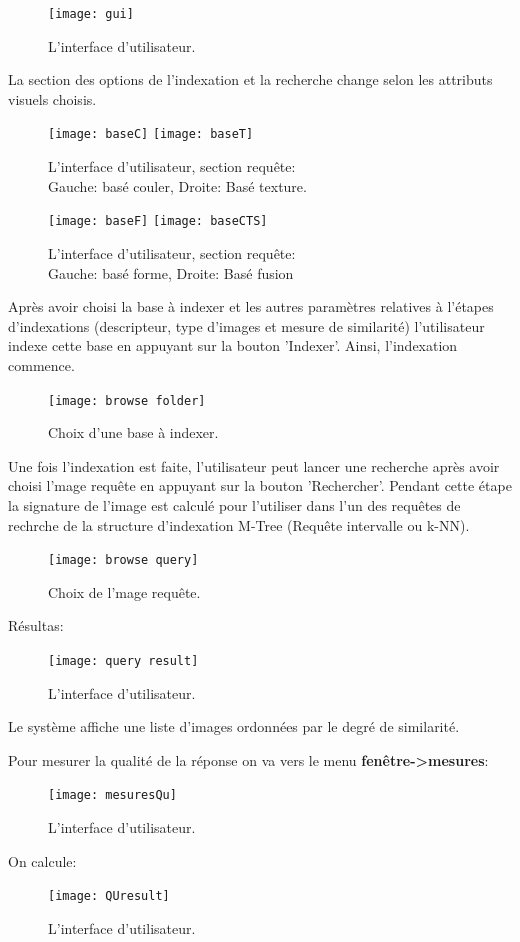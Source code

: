 \begin{figure}[H]
	\centering
	\texttt{[image: gui]} 
	\caption{L'interface d’utilisateur.}
\end{figure}

La section des options de l'indexation et la recherche change selon les attributs visuels choisis.

\begin{figure}[H]
	\centering
	\texttt{[image: baseC]} \space
	\texttt{[image: baseT]} 
	\caption{L'interface d’utilisateur, section requête: \\
	Gauche: basé couler, Droite: Basé texture.}
\end{figure}
\begin{figure}[H]
	\centering
	\texttt{[image: baseF]} \space
	\texttt{[image: baseCTS]} 
	\caption{L'interface d’utilisateur, section requête: \\
		Gauche: basé forme, Droite: Basé fusion}
\end{figure}


Après avoir choisi la base à indexer et les autres paramètres relatives à l'étapes d'indexations (descripteur, type d'images et mesure de similarité) l’utilisateur indexe cette base en appuyant sur la bouton 'Indexer'. Ainsi, l'indexation commence. \\

\begin{figure}[H]
	\centering
	\texttt{[image: browse folder]} 
	\caption{Choix d'une base à indexer.}
\end{figure}

Une fois l'indexation est faite, l’utilisateur peut lancer une recherche après avoir choisi l'mage requête en appuyant sur la bouton 'Rechercher'. Pendant cette étape la signature de l’image est calculé pour l'utiliser dans l'un des requêtes de rechrche de la structure d'indexation M-Tree (Requête intervalle ou k-NN).\\

\begin{figure}[H]
	\centering
	\texttt{[image: browse query]} 
	\caption{Choix de l'mage requête.}
\end{figure}
Résultas:
\begin{figure}[H]
	\centering
	\texttt{[image: query result]} 
	\caption{L'interface d’utilisateur.}
\end{figure}

Le système affiche une liste d'images ordonnées par le degré de similarité.

Pour mesurer la qualité de la réponse on va vers le menu \textbf{fenêtre->mesures}:
\begin{figure}[H]
	\centering
	\texttt{[image: mesuresQu]} 
	\caption{L'interface d’utilisateur.}
\end{figure}
On calcule:
\begin{figure}[H]
	\centering
	\texttt{[image: QUresult]} 
	\caption{L'interface d’utilisateur.}
\end{figure}

